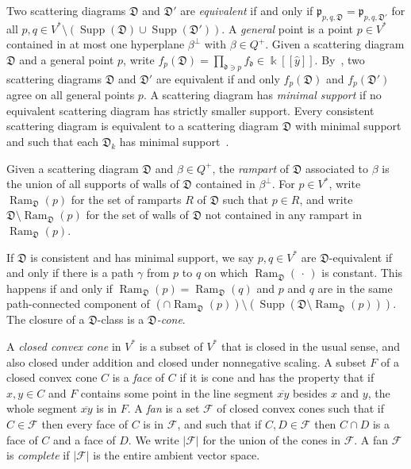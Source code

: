 \documentclass[10pt,a4paper]{amsart}
\theoremstyle{definition}
\DeclareMathOperator{\Ram}{Ram}
\DeclareMathOperator{\Supp}{Supp}
\newcommand{\newword}[1]{\emph{#1}}
\newcommand\llbracket{[\![}
\newcommand\rrbracket{]\!]}
\newcommand{\F}{{\mathcal F}}
\newcommand{\D}{{\mathfrak D}}
\newcommand{\p}{{\mathfrak p}}
\renewcommand{\k}{\Bbbk}
\renewcommand{\d}{{\mathfrak d}}
\newcommand{\seg}[1]{\overline{#1}}
\newcommand{\hy}{\hat{y}}
\begin{document}
Two scattering diagrams $\D$ and $\D'$ are \newword{equivalent} if and only if $\p_{p,q,\D}=\p_{p,q,\D'}$ for all $p,q\in V^*\setminus(\Supp(\D)\cup\Supp(\D'))$.
A \newword{general} point is a point $p\in V^*$ contained in at most one hyperplane $\beta^\perp$ with $\beta\in Q^+$.
Given a scattering diagram $\D$ and a general point $p$, write $f_p(\D)=\prod_{\d\ni p}f_\d\in\k\llbracket \hy\rrbracket $.
By~\cite[Lemma~1.9]{GHKK}, two scattering diagrams $\D$ and $\D'$ are equivalent if and only $f_p(\D)$ and $f_p(\D')$ agree on all general points $p$.
A scattering diagram has \newword{minimal support} if no equivalent scattering diagram has strictly smaller support.
Every consistent scattering diagram is equivalent to a scattering diagram $\D$ with minimal support and such that each $\D_k$ has minimal support~\cite[Proposition~2.8]{scatfan}.

Given a scattering diagram $\D$ and $\beta\in Q^+$, the \newword{rampart} of $\D$ associated to $\beta$ is the union of all supports of walls of $\D$ contained in $\beta^\perp$. 
For $p\in V^*$, write $\Ram_\D(p)$ for the set of ramparts $R$ of $\D$ such that $p\in R$, and write $\D\setminus\Ram_\D(p)$ for the set of walls of $\D$ not contained in any rampart in $\Ram_\D(p)$.

If $\D$ is consistent and has minimal support, we say $p,q\in V^*$ are $\D$-equivalent if and only if there is a path $\gamma$ from $p$ to $q$ on which $\Ram_\D(\,\cdot\,)$ is constant.
This happens if and only if $\Ram_\D(p)=\Ram_\D(q)$ and $p$ and $q$ are in the same path-connected component of $(\cap\Ram_\D(p))\setminus(\Supp(\D\setminus\Ram_\D(p)))$.
The closure of a $\D$-class is a \newword{$\D$-cone}.

A \newword{closed convex cone} in $V^*$ is a subset of $V^*$ that is closed in the usual sense, and also closed under addition and closed under nonnegative scaling.
A subset $F$ of a closed convex cone $C$ is a \newword{face} of $C$ if it is cone and has the property that if $x,y\in C$ and $F$ contains some point in the line segment $\seg{xy}$ besides $x$ and $y$, the whole segment $\seg{xy}$ is in $F$.
A \newword{fan} is a set $\F$ of closed convex cones such that if $C\in\F$ then every face of $C$ is in $\F$, and such that if $C,D\in\F$ then $C\cap D$ is a face of $C$ and a face of $D$.
We write $|\F|$ for the union of the cones in $\F$.
A fan $\F$ is \newword{complete} if $|\F|$ is the entire ambient vector space.
\end{document}
